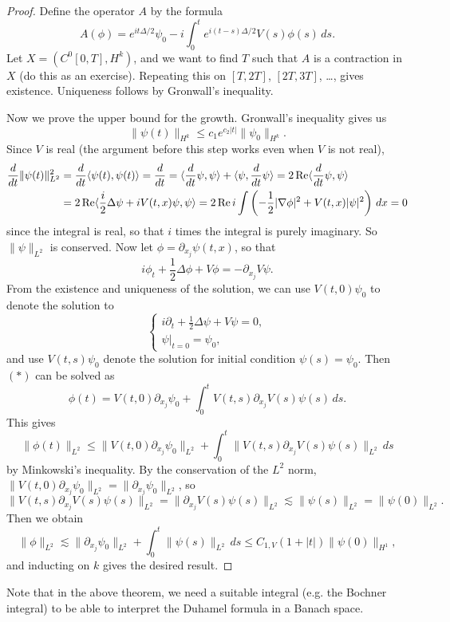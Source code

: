 \begin{proof}
  Define the operator $A$ by the formula
  \[
    A(\phi) = e^{it \Delta / 2} \psi_0 - i\int_0^t e^{i(t - s)\Delta / 2} V(s) \phi(s)\, ds.
  \]
  Let $X = (C^0[0, T], H^k)$, and we want to find
  $T$ such that $A$ is a contraction in $X$ (do this
  as an exercise). Repeating this
  on $[T, 2T]$, $[2T, 3T]$, \dots, gives
  existence. Uniqueness follows by Gronwall's inequality.

  Now we prove the upper bound for the growth.
  Gronwall's inequality gives us
  \[
    \|\psi(t)\|_{H^k} \le c_1 e^{c_2|t|} \|\psi_0\|_{H^k}.
  \]
  Since $V$ is real (the argument before this step
  works even when $V$ is not real),
  \begin{align*}
    \frac{d}{dt} \|\psi(t)\|_{L^2}^2
    &= \frac{d}{dt} \langle \psi(t), \psi(t) \rangle
    = \frac{d}{dt}
    = \langle \frac{d}{dt} \psi, \psi \rangle
    + \langle \psi, \frac{d}{dt} \psi \rangle
    = 2 \operatorname{Re} \langle \frac{d}{dt} \psi, \psi \rangle \\
    &= 2 \operatorname{Re} \langle \frac{i}{2} \Delta \psi + iV(t, x) \psi, \psi \rangle
    = 2\operatorname{Re} i \int \left(-\frac{1}{2} |\nabla \phi|^2 + V(t, x)|\psi|^2\right)\, dx = 0
  \end{align*}
  since the integral is real, so that $i$ times the
  integral is purely imaginary. So
  $\|\psi\|_{L^2}$ is conserved.
  Now let $\phi = \partial_{x_j} \psi(t, x)$, so that
  \[
    i\phi_t + \frac{1}{2} \Delta \phi + V \phi = -\partial_{x_j} V\psi. \tag{$*$}
  \]
  From the existence and uniqueness of the solution,
  we can use $V(t, 0) \psi_0$ to denote the solution
  to
  \[
    \begin{cases}
      i\partial_t + \frac{1}{2} \Delta \psi + V \psi = 0, \\
      \psi|_{t = 0} = \psi_0,
    \end{cases}
  \]
  and use $V(t, s) \psi_0$ denote the solution
  for initial condition $\psi(s) = \psi_0$. Then
  $(*)$ can be solved as
  \[
    \phi(t) = V(t, 0) \partial_{x_j} \psi_0
    + \int_0^t V(t, s) \partial_{x_j} V(s) \psi(s)\, ds.
  \]
  This gives
  \[
    \|\phi(t)\|_{L^2} \le
    \|V(t, 0) \partial_{x_j} \psi_0\|_{L^2}
    + \int_0^t \|V(t, s) \partial_{x_j} V(s) \psi(s)\|_{L^2}\, ds
  \]
  by Minkowski's inequality.  By the
  conservation of the $L^2$ norm,
  $\|V(t, 0) \partial_{x_j} \psi_0\|_{L^2} = \|\partial_{x_j} \psi_0 \|_{L^2}$, so
  \[
    \|V(t, s) \partial_{x_j} V(s) \psi(s)\|_{L^2}
    = \|\partial_{x_j} V(s) \psi(s)\|_{L^2}
    \lesssim \|\psi(s)\|_{L^2} = \|\psi(0)\|_{L^2}.
  \]
  Then we obtain
  \[
    \|\phi\|_{L^2} \lesssim
    \|\partial_{x_j} \psi_0\|_{L^2}
    + \int_0^t \|\psi(s)\|_{L^2}\, ds
    \le C_{1, V} (1 + |t|) \|\psi(0)\|_{H^1},
  \]
  and inducting on $k$ gives the desired result.
\end{proof}

\begin{remark}
  Note that in the above theorem, we need a suitable
  integral (e.g. the Bochner integral) to be able to
  interpret the Duhamel formula in a Banach space.
\end{remark}
